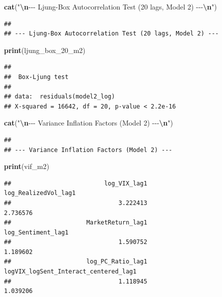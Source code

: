\documentclass[
]{article}
\newenvironment{Shaded}{\begin{snugshade}}{\end{snugshade}}
\newcommand{\FunctionTok}[1]{\textcolor[rgb]{0.13,0.29,0.53}{\textbf{#1}}}
\newcommand{\NormalTok}[1]{#1}
\newcommand{\SpecialCharTok}[1]{\textcolor[rgb]{0.81,0.36,0.00}{\textbf{#1}}}
\newcommand{\StringTok}[1]{\textcolor[rgb]{0.31,0.60,0.02}{#1}}
\begin{document}
\begin{Shaded}
\begin{Highlighting}[]
    \FunctionTok{cat}\NormalTok{(}\StringTok{"}\SpecialCharTok{\textbackslash{}n}\StringTok{{-}{-}{-} Ljung{-}Box Autocorrelation Test (20 lags, Model 2) {-}{-}{-}}\SpecialCharTok{\textbackslash{}n}\StringTok{"}\NormalTok{)}
\end{Highlighting}
\end{Shaded}

\begin{verbatim}
## 
## --- Ljung-Box Autocorrelation Test (20 lags, Model 2) ---
\end{verbatim}

\begin{Shaded}
\begin{Highlighting}[]
    \FunctionTok{print}\NormalTok{(ljung\_box\_20\_m2)}
\end{Highlighting}
\end{Shaded}

\begin{verbatim}
## 
##  Box-Ljung test
## 
## data:  residuals(model2_log)
## X-squared = 16642, df = 20, p-value < 2.2e-16
\end{verbatim}

\begin{Shaded}
\begin{Highlighting}[]
    \FunctionTok{cat}\NormalTok{(}\StringTok{"}\SpecialCharTok{\textbackslash{}n}\StringTok{{-}{-}{-} Variance Inflation Factors (Model 2) {-}{-}{-}}\SpecialCharTok{\textbackslash{}n}\StringTok{"}\NormalTok{)}
\end{Highlighting}
\end{Shaded}

\begin{verbatim}
## 
## --- Variance Inflation Factors (Model 2) ---
\end{verbatim}

\begin{Shaded}
\begin{Highlighting}[]
    \FunctionTok{print}\NormalTok{(vif\_m2)}
\end{Highlighting}
\end{Shaded}

\begin{verbatim}
##                          log_VIX_lag1                  log_RealizedVol_lag1 
##                              3.222413                              2.736576 
##                     MarketReturn_lag1                    log_Sentiment_lag1 
##                              1.590752                              1.189602 
##                     log_PC_Ratio_lag1 logVIX_logSent_Interact_centered_lag1 
##                              1.118945                              1.039206
\end{verbatim}
\end{document}
